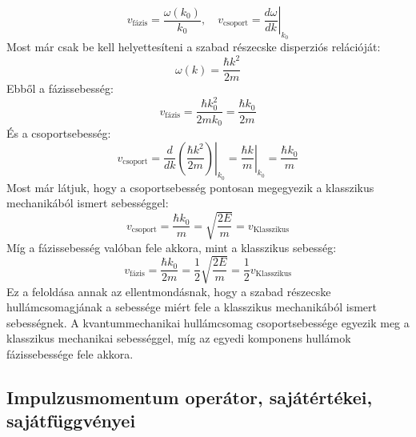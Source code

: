 \documentclass[../main.tex]{subfiles}
\begin{document}
\begin{equation}
    \boxed{v_{\text{fázis}} = \frac{\omega(k_0)}{k_0}, \quad v_{\text{csoport}} = \left. \frac{d \omega}{d k} \right|_{k_0}}
\end{equation}
Most már csak be kell helyettesíteni a szabad részecske disperziós relációját:
\begin{equation}
    \omega(k) = \frac{\hbar k^2}{2m}
\end{equation}
Ebből a fázissebesség:
\begin{equation}
    v_{\text{fázis}} = \frac{\hbar k_0^2}{2m k_0} = \frac{\hbar k_0}{2m}
\end{equation}
És a csoportsebesség:
\begin{equation}
    v_{\text{csoport}} = \left. \frac{d}{d k} \left( \frac{\hbar k^2}{2m} \right) \right|_{k_0} = \left. \frac{\hbar k}{m} \right|_{k_0} = \frac{\hbar k_0}{m}
\end{equation}
Most már látjuk, hogy a csoportsebesség pontosan megegyezik a klasszikus mechanikából ismert sebességgel:
\begin{equation}
    v_{\text{csoport}} = \frac{\hbar k_0}{m} = \sqrt{\frac{2E}{m}} = v_{\text{Klasszikus}}
\end{equation}
Míg a fázissebesség valóban fele akkora, mint a klasszikus sebesség:
\begin{equation}
    v_{\text{fázis}} = \frac{\hbar k_0}{2m} = \frac{1}{2} \sqrt{\frac{2E}{m}} = \frac{1}{2} v_{\text{Klasszikus}}
\end{equation}
Ez a feloldása annak az ellentmondásnak, hogy a szabad részecske hullámcsomagjának a sebessége miért fele a klasszikus mechanikából ismert sebességnek. A kvantummechanikai hullámcsomag
csoportsebessége egyezik meg a klasszikus mechanikai sebességgel, míg az egyedi komponens hullámok fázissebessége fele akkora.


\subsection{Impulzusmomentum operátor, sajátértékei, sajátfüggvényei}
\end{document}
